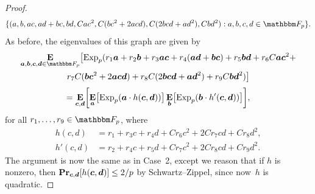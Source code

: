 \documentclass[10pt,a4paper]{article}
\theoremstyle{definition}
\renewcommand{\Pr}{\mathop{\bf Pr\/}}
\newcommand{\E}{\mathop{\bf E\/}}
\newcommand{\N}{\mathbbm N}
\newcommand{\Z}{\mathbbm Z}
\newcommand{\F}{\mathbbm F}
\newcommand{\ba}{\boldsymbol{a}}
\newcommand{\bb}{\boldsymbol{b}}
\newcommand{\bc}{\boldsymbol{c}}
\newcommand{\bd}{\boldsymbol{d}}
\DeclarePairedDelimiter\bracks{\lbrack}{\rbrack}
\newcommand{\CC}[2]{\mathcal{C}\mathcal{C}(#1;#2)}
\newcommand{\Exp}{{\mathrm{Exp}}}
\begin{document}
\begin{proof}
    \begin{align*}
        \{(a,b,ac,ad+bc,bd,Cac^2,C(bc^2+2acd),C(2bcd+ad^2),Cbd^2)
        : a,b,c,d \in \F_p\}.
        \end{align*}
        As before, the eigenvalues of this graph are given by
        \begin{multline*}
         \E_{\ba,\bb,\bc,\bd \in \F_p}\bigl[\Exp_p( r_1\ba+r_2\bb+r_3\ba\bc+r_4(\ba\bd+\bb\bc) + r_5\bb\bd +r_6C\ba\bc^2+ \\
        r_7C(\bb\bc^2+2\ba\bc\bd)+r_8C(2\bb\bc\bd+\ba\bd^2)+r_9C\bb\bd^2)\bigr]
        \end{multline*}
        \begin{equation} 
            \mathrel{=}  \E_{\bc,\bd}\bracks*{
            \E_{\ba}\bracks*{\Exp_p(\ba \cdot h(\bc,\bd))}
            \E_{\bb}\bracks*{\Exp_p(\bb \cdot h'(\bc,\bd))}}, \label{sum2}
        \end{equation}
        for all $r_1, \ldots, r_9 \in \F_p$, where
        \begin{align*}
        h(c,d) &= r_1+r_3c+r_4d+Cr_6c^2+2Cr_7cd+Cr_8d^2,\\
        h'(c,d) &= r_2+r_4c+r_5d+Cr_7c^2+2Cr_8cd+Cr_9d^2.
        \end{align*}
        The argument is now the same as in Case~2, except we reason that if $h$ is nonzero, then $\Pr_{\bc,\bd}[h(\bc,\bd)] \leq 2/p$ by Schwartz--Zippel, since now~$h$ is quadratic.
    \end{proof}



\end{document}
